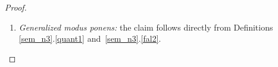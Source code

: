 \begin{proof}
\begin{enumerate}
% 
\item \emph{Generalized modus ponens:} the claim follows directly from Definitions \ref{sem_n3}.\ref{quant1} %
and~\ref{sem_n3}.\ref{fal2}.
\end{enumerate}
\end{proof}

